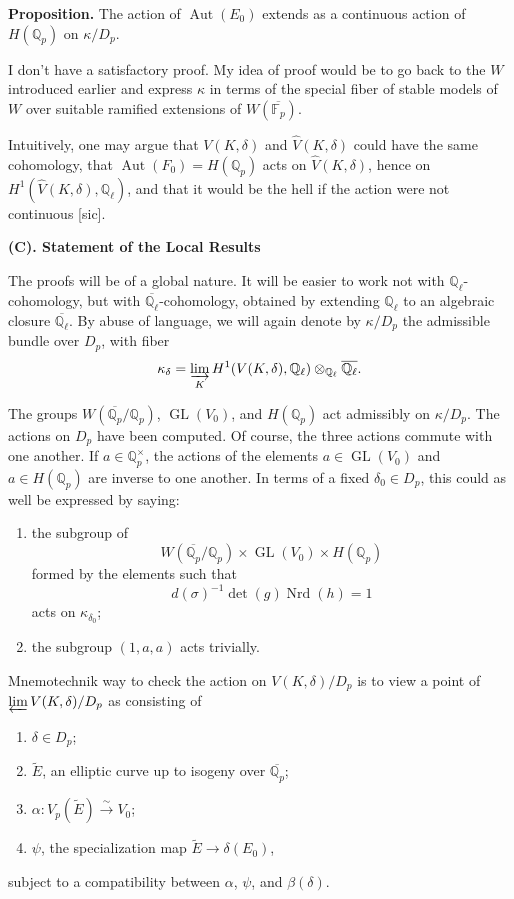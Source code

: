 \documentclass[11pt]{article}
\newcommand{\Fp}{\mathbb{F}_{p}}
\newcommand{\Qp}{\mathbb{Q}_{p}}
\newcommand{\Ql}{\mathbb{Q}_{\ell}}
\newcommand{\Aut}{\operatorname{Aut}}
\newcommand{\GL}{\operatorname{GL}}
\newcommand{\Nrd}{\operatorname{Nrd}}
\newcommand{\Lim}{\varinjlim}
\newcommand{\Prolim}{\varprojlim}
\newcommand{\wt}{\widetilde}
\newcommand{\wh}{\widehat}
\begin{document}
\textbf{Proposition.} The action of \(\Aut(E_0)\) extends as a continuous action of \(H(\Qp)\) on \(\kappa/D_p\).

I don’t have a satisfactory proof. My idea of proof would be to go back to the \(W\) introduced earlier and express \(\kappa\) in terms of the special fiber of stable models of \(W\) over suitable ramified extensions of \(W(\overline{\Fp})\).

Intuitively, one may argue that \(V(K,\delta)\) and \(\wh V(K,\delta)\) could have the same cohomology, that \(\Aut(F_0)=H(\Qp)\) acts on \(\wh V(K,\delta)\), hence on \(H^1(\wh V(K,\delta),\Ql)\), and that it would be the hell if the action were not continuous [sic].

\begin{center}
\textbf{(C). Statement of the Local Results}
\end{center}

The proofs will be of a global nature. It will be easier to work not with \(\Ql\)-cohomology, but with \(\overline{\Ql}\)-cohomology, obtained by extending \(\Ql\) to an algebraic closure \(\overline{\Ql}\). By abuse of language, we will again denote by \(\kappa/D_p\) the admissible bundle over \(D_p\), with fiber
\[
\kappa_{\delta}=\Lim_K H^1(V(K,\delta),\Ql)\otimes_{\Ql}\overline{\Ql}.
\]

The groups \(W(\overline{\Qp}/\Qp)\), \(\GL(V_0)\), and \(H(\Qp)\) act admissibly on \(\kappa/D_p\). The actions on \(D_p\) have been computed. Of course, the three actions commute with one another. If \(a\in\Qp^\times\), the actions of the elements \(a\in\GL(V_0)\) and \(a\in H(\Qp)\) are inverse to one another. In terms of a fixed \(\delta_0\in D_p\), this could as well be expressed by saying:
\begin{enumerate}[label=(\alph*)]
\item the subgroup of
\[
W(\overline{\Qp}/\Qp)\times\GL(V_0)\times H(\Qp)
\]
formed by the elements such that
\[
d(\sigma)^{-1}\det(g)\Nrd(h)=1
\]
acts on \(\kappa_{\delta_0}\);
\item the subgroup \((1,a,a)\) acts trivially.
\end{enumerate}

Mnemotechnik way to check the action on \(V(K,\delta)/D_p\) is to view a point of \(\Prolim V(K,\delta)/D_p\) as consisting of
\begin{enumerate}[label=(\alph*)]
\item \(\delta\in D_p\);
\item \(\wt E\), an elliptic curve up to isogeny over \(\overline{\Qp}\);
\item \(\alpha:V_p(\wt E)\xrightarrow{\sim}V_0\);
\item \(\psi\), the specialization map \(\wt E\to\delta(E_0)\),
\end{enumerate}
subject to a compatibility between \(\alpha\), \(\psi\), and \(\beta(\delta)\).
\end{document}

